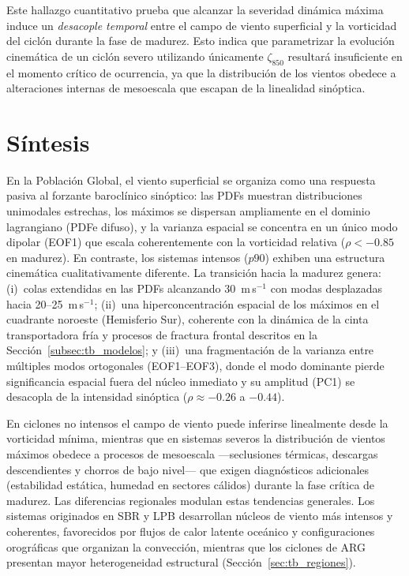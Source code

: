 

Este hallazgo cuantitativo prueba que alcanzar la severidad dinámica máxima induce un \textit{desacople temporal} entre el campo de viento superficial y la vorticidad del ciclón durante la fase de madurez.
Esto indica que parametrizar la evolución cinemática de un ciclón severo utilizando únicamente $\zeta_{850}$ resultará insuficiente en el momento crítico de ocurrencia, ya que la distribución de los vientos obedece a alteraciones internas de mesoescala que escapan de la linealidad sinóptica. 

\section{Síntesis}\label{sec:sintesis_wind10}

En la Población Global, el viento superficial se organiza como una respuesta pasiva al forzante baroclínico sinóptico: las PDFs muestran distribuciones unimodales estrechas, los máximos se dispersan ampliamente en el dominio lagrangiano (PDFe difuso), y la varianza espacial se concentra en un único modo dipolar (EOF1) que escala coherentemente con la vorticidad relativa ($\rho < -0.85$ en madurez). 
En contraste, los sistemas intensos ($p90$) exhiben una estructura cinemática cualitativamente diferente. 
La transición hacia la madurez genera: 
(i)~colas extendidas en las PDFs alcanzando 30~m\,s$^{-1}$ con modas desplazadas hacia 20--25~m\,s$^{-1}$; 
(ii)~una hiperconcentración espacial de los máximos en el cuadrante noroeste (Hemisferio Sur), coherente con la dinámica de la cinta transportadora fría y procesos de fractura frontal descritos en la Sección~\ref{subsec:tb_modelos}; y 
(iii)~una fragmentación de la varianza entre múltiples modos ortogonales (EOF1--EOF3), donde el modo dominante pierde significancia espacial fuera del núcleo inmediato y su amplitud (PC1) se desacopla de la intensidad sinóptica ($\rho \approx -0.26$ a $-0.44$). 

En ciclones no intensos el campo de viento puede inferirse linealmente desde la vorticidad mínima, mientras que en sistemas severos la distribución de vientos máximos obedece a procesos de mesoescala ---seclusiones térmicas, descargas descendientes y chorros de bajo nivel--- que exigen diagnósticos adicionales (estabilidad estática, humedad en sectores cálidos) durante la fase crítica de madurez. 
Las diferencias regionales modulan estas tendencias generales. 
Los sistemas originados en SBR y LPB desarrollan núcleos de viento más intensos y coherentes, favorecidos por flujos de calor latente oceánico y configuraciones orográficas que organizan la convección, mientras que los ciclones de ARG presentan mayor heterogeneidad estructural (Sección~\ref{sec:tb_regiones}).

